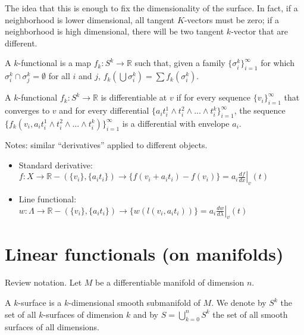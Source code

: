 \documentclass[11pt,letterpaper,fleqn]{memoir}
\begin{document}
\begin{remark}
	The idea that this is enough to fix the dimensionality of the surface. In fact, if a neighborhood is lower dimensional, all tangent $K$-vectors must be zero; if a neighborhood is high dimensional, there will be two tangent $k$-vector that are different.
\end{remark}

\begin{defn}
	A $k$-functional is a map $f_k : S^k \to \mathbb{R}$ such that,  given a family $\{ \sigma^k_i\}_{i=1}^{\infty}$ for which $\sigma^k_i \cap \sigma^k_j = \emptyset$ for all $i$ and $j$, $f_k(\bigcup \sigma^k_i) = \sum f_k(\sigma^k_i)$.
\end{defn}

\begin{defn}
	A $k$-functional $f_k : S^k \to \mathbb{R}$ is differentiable at $v$ if for every sequence $\{v_i\}_{i=1}^{\infty}$ that converges to $v$ and for every differential $\{a_i {t}^1_i \wedge {t}^2_i \wedge ... \wedge {t}^k_i \}_{i=1}^{\infty}$, the sequence $\{f_k(v_i, a_i {t}^1_i \wedge {t}^2_i \wedge ... \wedge {t}^k_i) \}_{i=1}^{\infty}$ is a differential with envelope $a_i$.
\end{defn}

Notes: similar ``derivatives'' applied to different objects.
\begin{itemize}
	\item Standard derivative: $f : X \to \mathbb{R} - (\{v_i\}, \{a_i t_i\}) \to \{f(v_i +a_i t_i) - f(v_i)\} = a_i \left. \frac{df}{dx} \right|_{v}(t)$
	\item Line functional: $w : \Lambda \to \mathbb{R} - (\{v_i\}, \{a_i t_i\}) \to \{w(l(v_i, a_i t_i))\} = a_i \left. \frac{dw}{d\lambda} \right|_{v}(t)$
\end{itemize}

\section{Linear functionals (on manifolds)}

Review notation. Let $M$ be a differentiable manifold of dimension $n$.

\begin{defn}
	A $k$-surface is a $k$-dimensional smooth submanifold of $M$. We denote by $S^k$ the set of all  $k$-surfaces of dimension $k$ and by $S = \bigcup_{k=0}^n S^k$ the set of all smooth surfaces of all dimensions.
\end{defn}
\end{document}
